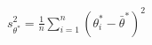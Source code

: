 \begin{align*}
    s_{\theta^*}^2 = \frac{1}{n}\sum_{i=1}^n (\theta^*_i - \bar{\theta}^*)^2
\end{align*}